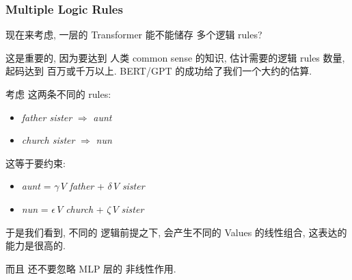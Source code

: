 \begin{preview}
\begin{minipage}{\textwidth}
\subsubsection{Multiple Logic Rules}

现在来考虑, 一层的 Transformer 能不能储存 多个逻辑 rules?

这是重要的, 因为要达到 人类 common sense 的知识, 估计需要的逻辑 rules 数量, 起码达到 百万或千万以上.  BERT/GPT 的成功给了我们一个大约的估算.

考虑 这两条不同的 rules:
\begin{itemize}
	\item \textit{father sister} $\Rightarrow$ \textit{aunt}
	\item \textit{church sister} $\Rightarrow$ \textit{nun}
\end{itemize}
这等于要约束:
\begin{itemize}
	\item \textit{aunt} = $\gamma \, V$ \textit{father} + $\delta \, V$ \textit{sister}
	\item \textit{nun} = $\epsilon \, V$ \textit{church} + $\zeta \, V$ \textit{sister}
\end{itemize}
于是我们看到, 不同的 逻辑前提之下, 会产生不同的 Values 的线性组合, 这表达的能力是很高的.

而且 还不要忽略 MLP 层的 非线性作用.

\end{minipage}
\end{preview}

